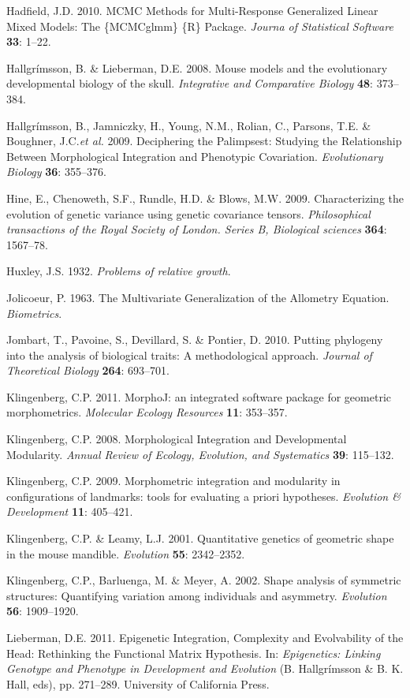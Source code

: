 \documentclass[11pt,twoside]{report}
\begin{document}
Hadfield, J.D. 2010. MCMC Methods for Multi-Response Generalized Linear
Mixed Models: The \{MCMCglmm\} \{R\} Package. \emph{Journa of
Statistical Software} \textbf{33}: 1--22.

Hallgrímsson, B. \& Lieberman, D.E. 2008. Mouse models and the
evolutionary developmental biology of the skull. \emph{Integrative and
Comparative Biology} \textbf{48}: 373--384.

Hallgrímsson, B., Jamniczky, H., Young, N.M., Rolian, C., Parsons, T.E.
\& Boughner, J.C.\emph{et al.} 2009. Deciphering the Palimpsest:
Studying the Relationship Between Morphological Integration and
Phenotypic Covariation. \emph{Evolutionary Biology} \textbf{36}:
355--376.

Hine, E., Chenoweth, S.F., Rundle, H.D. \& Blows, M.W. 2009.
Characterizing the evolution of genetic variance using genetic
covariance tensors. \emph{Philosophical transactions of the Royal
Society of London. Series B, Biological sciences} \textbf{364}:
1567--78.

Huxley, J.S. 1932. \emph{Problems of relative growth}.

Jolicoeur, P. 1963. The Multivariate Generalization of the Allometry
Equation. \emph{Biometrics}.

Jombart, T., Pavoine, S., Devillard, S. \& Pontier, D. 2010. Putting
phylogeny into the analysis of biological traits: A methodological
approach. \emph{Journal of Theoretical Biology} \textbf{264}: 693--701.

Klingenberg, C.P. 2011. MorphoJ: an integrated software package for
geometric morphometrics. \emph{Molecular Ecology Resources} \textbf{11}:
353--357.

Klingenberg, C.P. 2008. Morphological Integration and Developmental
Modularity. \emph{Annual Review of Ecology, Evolution, and Systematics}
\textbf{39}: 115--132.

Klingenberg, C.P. 2009. Morphometric integration and modularity in
configurations of landmarks: tools for evaluating a priori hypotheses.
\emph{Evolution \& Development} \textbf{11}: 405--421.

Klingenberg, C.P. \& Leamy, L.J. 2001. Quantitative genetics of
geometric shape in the mouse mandible. \emph{Evolution} \textbf{55}:
2342--2352.

Klingenberg, C.P., Barluenga, M. \& Meyer, A. 2002. Shape analysis of
symmetric structures: Quantifying variation among individuals and
asymmetry. \emph{Evolution} \textbf{56}: 1909--1920.

Lieberman, D.E. 2011. Epigenetic Integration, Complexity and
Evolvability of the Head: Rethinking the Functional Matrix Hypothesis.
In: \emph{Epigenetics: Linking Genotype and Phenotype in Development and
Evolution} (B. Hallgrímsson \& B. K. Hall, eds), pp. 271--289.
University of California Press.
\end{document}
